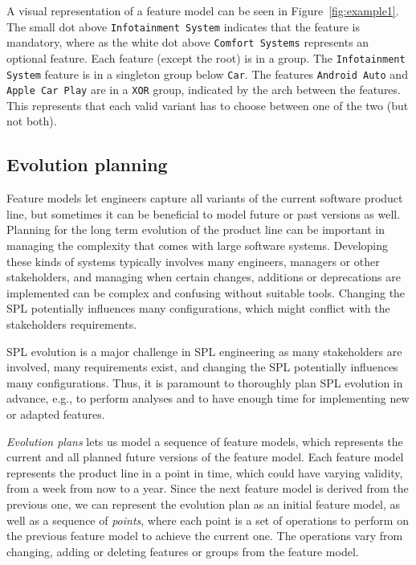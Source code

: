 \documentclass[a4paper,english]{ifimaster}
\begin{document}
A visual representation of a feature model can be seen in Figure~\vref{fig:example1}. The small dot above \texttt{Infotainment System} indicates that the feature is mandatory, where as the white dot above \texttt{Comfort Systems} represents an optional feature. Each feature (except the root) is in a group. The \texttt{Infotainment System} feature is in a singleton group below \texttt{Car}. The features \texttt{Android Auto} and \texttt{Apple Car Play} are in a \texttt{XOR} group, indicated by the arch between the features. This represents that each valid variant has to choose between one of the two (but not both).

\subsection{Evolution planning}%
\label{sub:evolution_planning}

Feature models let engineers capture all variants of the current software product line, but sometimes it can be beneficial to model future or past versions as well. Planning for the long term evolution of the product line can be important in managing the complexity that comes with large software systems. Developing these kinds of systems typically involves many engineers, managers or other stakeholders, and managing when certain changes, additions or deprecations are implemented can be complex and confusing without suitable tools. Changing the SPL potentially influences many configurations, which might conflict with the stakeholders requirements.

SPL evolution is a major challenge in SPL engineering as many stakeholders are involved, many requirements exist, and changing the SPL potentially influences many configurations. Thus, it is paramount to thoroughly plan SPL evolution in advance, e.g., to perform analyses and to have enough time for implementing new or adapted features.

\textit{Evolution plans} lets us model a sequence of feature models, which represents the current and all planned future versions of the feature model. Each feature model represents the product line in a point in time, which could have varying validity, from a week from now to a year. Since the next feature model is derived from the previous one, we can represent the evolution plan as an initial feature model, as well as a sequence of \textit{points}, where each point is a set of operations to perform on the previous feature model to achieve the current one. The operations vary from changing, adding or deleting features or groups from the feature model.
\end{document}
